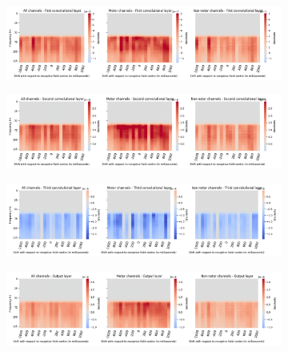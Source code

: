 \begin{figure}[!htpb]
\centering
\begin{subfigure}[b]{\textwidth}
   \includegraphics[width=0.9\linewidth]{img/appendix/C/hp-m/absVel/sbp0_hp_m_shift_gradients_conv_2_all_kinds}
   \caption{}
   \label{fig:absVel-hp-shifting-grads-conv-2}
\end{subfigure}

\begin{subfigure}[b]{\textwidth}
   \includegraphics[width=0.9\linewidth]{img/appendix/C/hp-m/absVel/sbp0_hp_m_shift_gradients_conv_3_all_kinds}
   \caption{}
   \label{fig:absVel-hp-shifting-grads-conv-3}
\end{subfigure}

\begin{subfigure}[b]{\textwidth}
   \includegraphics[width=0.9\linewidth]{img/appendix/C/hp-m/absVel/sbp0_hp_m_shift_gradients_conv_4_all_kinds}
   \caption{}
   \label{fig:absVel-hp-shifting-grads-conv-4}
\end{subfigure}

\begin{subfigure}[b]{\textwidth}
   \includegraphics[width=0.9\linewidth]{img/appendix/C/hp-m/absVel/sbp0_hp_m_shift_gradients_conv_classifier_all_kinds}
   \caption{}
   \label{fig:absVel-hp-shifting-grads-conv-classifier}
\end{subfigure}


\end{figure}
